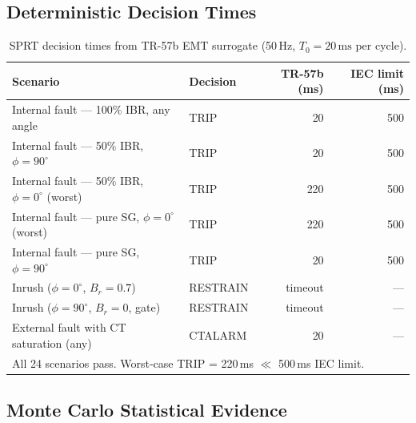 \documentclass[11pt, a4paper]{article}
\newcommand{\ms}{\,\text{ms}}
\begin{document}
\subsection{Deterministic Decision Times}

\begin{table}[htbp]
  \centering
  \caption{SPRT decision times from TR-57b EMT surrogate (50\,Hz,
    $T_0 = 20\ms$ per cycle).}
  \label{tab:decision_times}
  \begin{tabular}{p{5.5cm}lrr}
    \toprule
    \textbf{Scenario} & \textbf{Decision} & \textbf{TR-57b (ms)}
      & \textbf{IEC limit (ms)} \\
    \midrule
    Internal fault — 100\% IBR, any angle     & TRIP    & 20  & 500 \\
    Internal fault — 50\% IBR, $\phi=90^\circ$ & TRIP   & 20  & 500 \\
    Internal fault — 50\% IBR, $\phi=0^\circ$ (worst) & TRIP & 220 & 500 \\
    Internal fault — pure SG, $\phi=0^\circ$ (worst) & TRIP & 220 & 500 \\
    Internal fault — pure SG, $\phi=90^\circ$  & TRIP   & 20  & 500 \\
    Inrush ($\phi=0^\circ$, $B_r=0.7$)        & RESTRAIN & timeout & — \\
    Inrush ($\phi=90^\circ$, $B_r=0$, gate)   & RESTRAIN & timeout & — \\
    External fault with CT saturation (any)     & CTALARM & 20 & — \\
    \bottomrule
    \multicolumn{4}{l}{\footnotesize All 24 scenarios pass. Worst-case TRIP = 220\,ms
      $\ll$ 500\,ms IEC limit.}
  \end{tabular}
\end{table}

\subsection{Monte Carlo Statistical Evidence}
\end{document}
